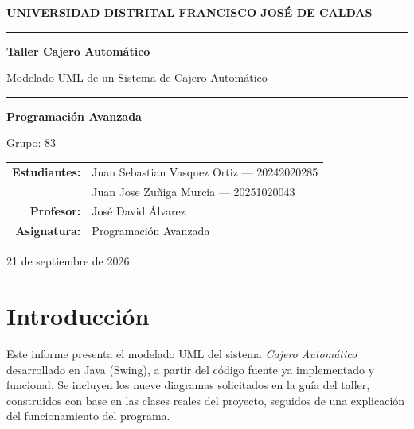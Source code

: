 \documentclass[11pt]{article}
\begin{document}
\begin{titlepage}
    \centering
    \vspace*{1.8cm}
    {\large\bfseries UNIVERSIDAD DISTRITAL FRANCISCO JOSÉ DE CALDAS\par}
    \vspace{2cm}

    \rule{\textwidth}{0.8pt}\par
    \vspace{0.6cm}
    {\Huge\bfseries Taller Cajero Automático\par}
    \vspace{0.4cm}
    {\Large Modelado UML de un Sistema de Cajero Automático\par}
    \vspace{0.6cm}
    \rule{\textwidth}{0.8pt}\par

    \vspace{2.5cm}
    {\large\bfseries Programación Avanzada\par}
    \vspace{0.2cm}
    {\large Grupo: 83\par}

    \vspace{2cm}
    \begin{tabular}{rl}
        \textbf{Estudiantes:} & Juan Sebastian Vasquez Ortiz — 20242020285 \\
         & Juan Jose Zuñiga Murcia — 20251020043 \\[4pt]
        \textbf{Profesor:} & José David Álvarez \\[4pt]
        \textbf{Asignatura:} & Programación Avanzada \\
    \end{tabular}

    \vfill
    {\large 21 de septiembre de 2026\par}
\end{titlepage}

\tableofcontents
\newpage

\section{Introducción}

Este informe presenta el modelado UML del sistema \textit{Cajero Automático} desarrollado en Java (Swing), a partir del código fuente ya implementado y funcional. Se incluyen los nueve diagramas solicitados en la guía del taller, construidos con base en las clases reales del proyecto, seguidos de una explicación del funcionamiento del programa.
\end{document}
